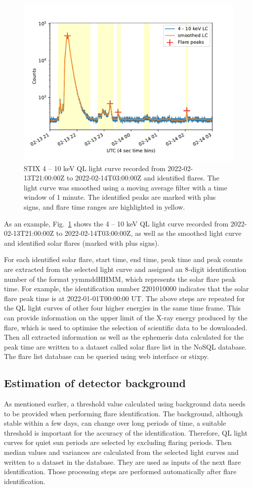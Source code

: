 \documentclass{aa}
\begin{document}
\begin{figure}
  \centering
  \includegraphics[width=0.8\linewidth]{figures/flaredet.pdf}
  \caption{STIX 4 -- 10 keV QL light curve recorded from  2022-02-13T21:00:00Z to 2022-02-14T03:00:00Z and 
  identified flares.   The light curve was smoothed using a moving average filter with a time window
  of 1 minute. The identified peaks are marked with plus signs, and flare time ranges are highlighted in yellow.
  }
  \label{fig:flare-det}
\end{figure}
As an example, Fig.~\ref{fig:flare-det} shows  the 4 -- 10 keV QL  light curve recorded from 
2022-02-13T21:00:00Z to 2022-02-14T03:00:00Z, as well as the smoothed light curve and  identified solar flares (marked with plus signs).

For each identified solar flare,  start time, end time, peak time and peak 
counts are extracted from the selected light curve and assigned 
an 8-digit identification number of the format yymmddHHMM, which represents the solar flare peak time. 
For example, the identification number 2201010000  indicates that 
the solar flare peak time is at 2022-01-01T00:00:00 UT. 
The above steps are repeated  for the QL light curves of other four higher energies
in the same time frame. This can provide information on the upper limit of the X-ray energy produced by the flare,
which is used to optimise the selection of scientific data to be downloaded. 
Then all extracted information as well as the ephemeris data calculated for the peak time are 
written to a dataset called solar flare list in the NoSQL database.
The flare list database can be queried using web interface or stixpy.
\subsection{Estimation of detector background}
As mentioned earlier, a threshold value calculated using background data needs to be provided when
performing flare identification.  
The background, although stable within a few days, can change over long periods of time,
 a suitable threshold is important for the accuracy of the identification. 
 Therefore, QL light curves for  quiet sun periods are selected by excluding flaring periods. 
 Then median values and variances are calculated from the selected light curves and 
 written to a dataset in the database. They are used as inputs of the next flare identification. 
 Those processing steps are performed automatically after flare identification.
\end{document}

